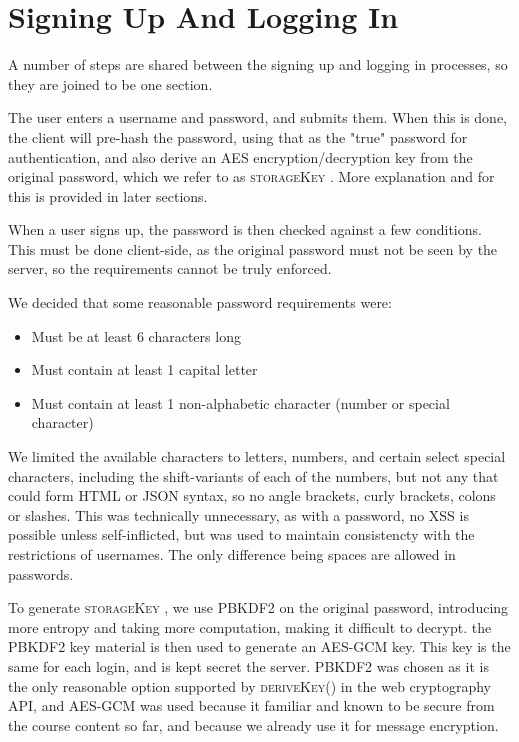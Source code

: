 \documentclass[12pt]{article}
\newcommand{\bryce}{\hfill\normalsize\sc [bkni0201]}
\newcommand{\skey}{\textsc{storageKey} }
\begin{document}
\tableofcontents
\newpage

\section[Signup And Login]{Signing Up And Logging In \bryce}

A number of steps are shared between the signing up and logging in processes, so they are joined to be one section.

The user enters a username and password, and submits them. When this is done, the client will pre-hash the password, using that as the "true" password for authentication, and also derive an AES encryption/decryption key from the original password, which we refer to as \skey. More explanation and for this is provided in later sections.

When a user signs up, the password is then checked against a few conditions. This must be done client-side, as the original password must not be seen by the server, so the requirements cannot be truly enforced.

We decided that some reasonable password requirements were:

\begin{itemize}
    \item Must be at least 6 characters long
    \item Must contain at least 1 capital letter
    \item Must contain at least 1 non-alphabetic character (number or special character)
\end{itemize}

We limited the available characters to letters, numbers, and certain select special characters, including the shift-variants of each of the numbers, but not any that could form HTML or JSON syntax, so no angle brackets, curly brackets, colons or slashes. This was technically unnecessary, as with a password, no XSS is possible unless self-inflicted, but was used to maintain consistencty with the restrictions of usernames. The only difference being spaces are allowed in passwords.

To generate \skey, we use PBKDF2 on the original password, introducing more entropy and taking more computation, making it difficult to decrypt. the PBKDF2 key material is then used to generate an AES-GCM key. This key is the same for each login, and is kept secret the server. PBKDF2 was chosen as it is the only reasonable option supported by \textsc{deriveKey()} in the web cryptography API, and AES-GCM was used because it familiar and known to be secure from the course content so far, and because we already use it for message encryption.
\end{document}
